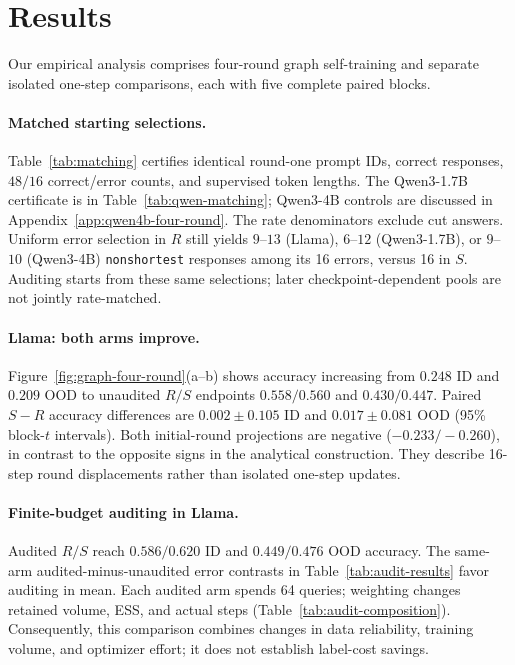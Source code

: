 \section{Results}
\label{sec:results}



Our empirical analysis comprises four-round graph self-training and
separate isolated one-step comparisons, each with five complete paired
blocks.

\paragraph{Matched starting selections.}
Table~\ref{tab:matching} certifies identical round-one prompt IDs, correct
responses, $48/16$ correct/error counts, and supervised token lengths.
The Qwen3-1.7B certificate is in Table~\ref{tab:qwen-matching};
Qwen3-4B controls are discussed in Appendix~\ref{app:qwen4b-four-round}.
The rate denominators exclude cut answers. Uniform error selection in $R$
still yields $9$--$13$ (Llama), $6$--$12$ (Qwen3-1.7B), or
$9$--$10$ (Qwen3-4B) \texttt{nonshortest}
responses among its 16 errors, versus 16 in $S$.
Auditing starts from these same selections; later checkpoint-dependent
pools are not jointly rate-matched.

\paragraph{Llama: both arms improve.}
Figure~\ref{fig:graph-four-round}(a--b) shows accuracy increasing from $0.248$ ID and
$0.209$ OOD to unaudited $R/S$ endpoints $0.558/0.560$ and $0.430/0.447$.
Paired $S-R$ accuracy differences are $0.002\pm0.105$ ID and
$0.017\pm0.081$ OOD (95\% block-$t$ intervals).
Both initial-round projections are negative ($-0.233/-0.260$), in contrast
to the opposite signs in the analytical construction. They describe
16-step round displacements rather than isolated one-step updates.

\paragraph{Finite-budget auditing in Llama.}
\label{sec:audit-results}
Audited $R/S$ reach $0.586/0.620$ ID and $0.449/0.476$ OOD accuracy.
The same-arm audited-minus-unaudited error contrasts in
Table~\ref{tab:audit-results} favor auditing in mean.
Each audited arm spends 64 queries; weighting changes retained volume,
ESS, and actual steps (Table~\ref{tab:audit-composition}).
Consequently, this comparison combines changes in data reliability,
training volume, and optimizer effort; it does not establish label-cost
savings. 

